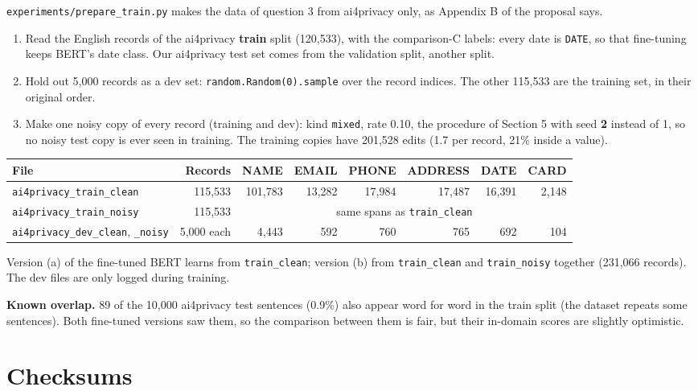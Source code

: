 \documentclass[10pt,a4paper]{article}
\newcommand{\file}[1]{\texttt{#1}}
\begin{document}
\file{experiments/prepare\_train.py} makes the data of question 3 from ai4privacy only, as Appendix
B of the proposal says.
\begin{enumerate}
\item Read the English records of the ai4privacy \textbf{train} split (120,533), with the
  comparison-C labels: every date is \file{DATE}, so that fine-tuning keeps BERT's date class.
  Our ai4privacy test set comes from the validation split, another split.
\item Hold out 5,000 records as a dev set: \file{random.Random(0).sample} over the record indices.
  The other 115,533 are the training set, in their original order.
\item Make one noisy copy of every record (training and dev): kind \file{mixed}, rate 0.10, the
  procedure of Section 5 with seed \textbf{2} instead of 1, so no noisy test copy is ever seen in
  training. The training copies have 201,528 edits (1.7 per record, 21\% inside a value).
\end{enumerate}

\begin{tabular}{@{}lrrrrrrr@{}}
\toprule
File & Records & NAME & EMAIL & PHONE & ADDRESS & DATE & CARD \\
\midrule
\file{ai4privacy\_train\_clean} & 115,533 & 101,783 & 13,282 & 17,984 & 17,487 & 16,391 & 2,148 \\
\file{ai4privacy\_train\_noisy} & 115,533 & \multicolumn{6}{c}{same spans as \file{train\_clean}} \\
\file{ai4privacy\_dev\_clean}, \file{\_noisy} & 5,000 each & 4,443 & 592 & 760 & 765 & 692 & 104 \\
\bottomrule
\end{tabular}

Version (a) of the fine-tuned BERT learns from \file{train\_clean}; version (b) from
\file{train\_clean} and \file{train\_noisy} together (231,066 records). The dev files are only
logged during training.

\textbf{Known overlap.} 89 of the 10,000 ai4privacy test sentences (0.9\%) also appear word for word
in the train split (the dataset repeats some sentences). Both fine-tuned versions saw them, so the
comparison between them is fair, but their in-domain scores are slightly optimistic.

\section{Checksums}\label{sec:checksums}
\end{document}
